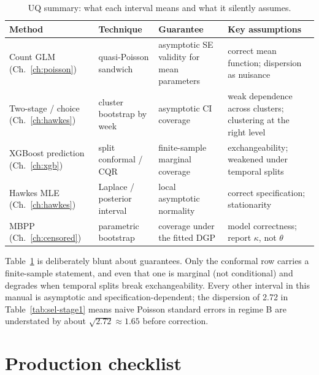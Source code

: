 \begin{table}[htbp]
\centering
\footnotesize
\begin{tabular}{p{2.9cm}p{2.9cm}p{3.6cm}p{4.4cm}}
\toprule
Method & Technique & Guarantee & Key assumptions \\
\midrule
Count GLM (Ch.~\ref{ch:poisson}) & quasi-Poisson sandwich &
asymptotic SE validity for mean parameters & correct mean function; dispersion as nuisance \\
Two-stage / choice (Ch.~\ref{ch:hawkes}) & cluster bootstrap by week &
asymptotic CI coverage & weak dependence across clusters; clustering at the right level \\
XGBoost prediction (Ch.~\ref{ch:xgb}) & split conformal / CQR \cite{romano2019} &
finite-sample marginal coverage & exchangeability; weakened under temporal splits \\
Hawkes MLE (Ch.~\ref{ch:hawkes}) & Laplace / posterior interval &
local asymptotic normality & correct specification; stationarity \\
MBPP (Ch.~\ref{ch:censored}) & parametric bootstrap &
coverage under the fitted DGP & model correctness; report $\kappa$, not $\theta$ \\
\bottomrule
\end{tabular}
\caption{UQ summary: what each interval means and what it silently assumes.}
\label{tab:sel-uq}
\end{table}

Table~\ref{tab:sel-uq} is deliberately blunt about guarantees. Only the conformal row carries a
finite-sample statement, and even that one is marginal (not conditional) and degrades when temporal splits
break exchangeability. Every other interval in this manual is asymptotic and specification-dependent; the
dispersion of 2.72 in Table~\ref{tab:sel-stage1} means naive Poisson standard errors in regime B are
understated by about $\sqrt{2.72} \approx 1.65$ before correction.

\section{Production checklist}
\label{sec:sel-checklist}

